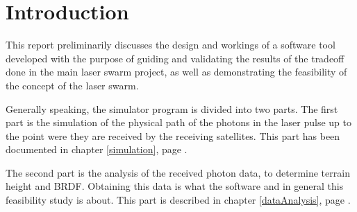 \chapter{Introduction}
\label{intro}
This report preliminarily discusses the design and workings of a software tool developed with the purpose of guiding and validating the results of the tradeoff done in the main laser swarm project, as well as demonstrating the feasibility of the concept of the laser swarm.

Generally speaking, the simulator program is divided into two parts. The first part is the simulation of the physical path of the photons in the laser pulse up to the point were they are received by the receiving satellites. This part has been documented in chapter \ref{simulation}, page \pageref{simulation}.

The second part is the analysis of the received photon data, to determine terrain height and \ac{BRDF}. Obtaining this data is what the software and in general this feasibility study is about. This part is described in chapter \ref{dataAnalysis}, page \pageref{dataAnalysis}.

